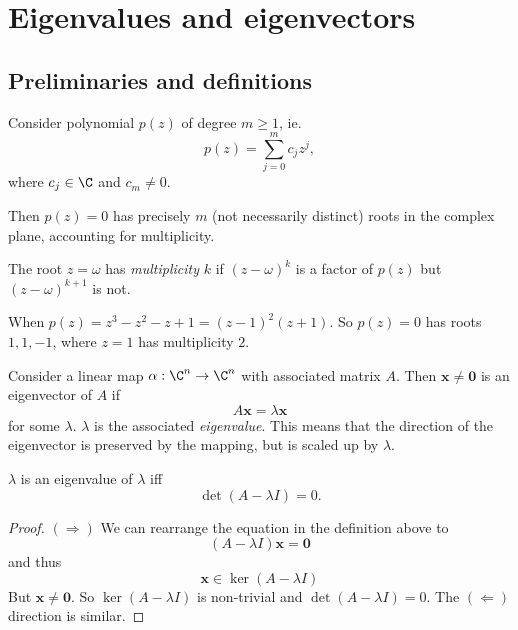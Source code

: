 \documentclass[a4paper]{article}
\begin{document}
\section{Eigenvalues and eigenvectors}
\subsection{Preliminaries and definitions}
\begin{thm}
  Consider polynomial $p(z)$ of degree $m \geq 1$, ie.
  \[
    p(z) = \sum_{j = 0}^m c_jz^j,
  \]
  where $c_j\in \C$ and $c_m \not= 0$.

  Then $p(z) = 0$ has precisely $m$ (not necessarily distinct) roots in the complex plane, accounting for multiplicity.
\end{thm}

\begin{defi}
  The root $z = \omega$ has \emph{multiplicity} $k$ if $(z - \omega)^k$ is a factor of $p(z)$ but $(z - \omega)^{k + 1}$ is not.
\end{defi}

\begin{eg}
  When $p(z) = z^3 - z^2 - z + 1 = (z - 1)^2(z + 1)$. So $p(z) = 0$ has roots $1, 1, -1$, where $z = 1$ has multiplicity $2$.
\end{eg}

\begin{defi}
  Consider a linear map $\alpha: \C^n\to \C^n$ with associated matrix $A$. Then $\mathbf{x}\not= \mathbf{0}$ is an eigenvector of $A$ if
  \[
    A\mathbf{x} = \lambda\mathbf{x}
  \]
  for some $\lambda$. $\lambda$ is the associated \emph{eigenvalue}. This means that the direction of the eigenvector is preserved by the mapping, but is scaled up by $\lambda$.
\end{defi}

\begin{thm}
  $\lambda$ is an eigenvalue of $\lambda$ iff
  \[
    \det(A - \lambda I) = 0.
  \]
\end{thm}

\begin{proof}
  $(\Rightarrow)$ We can rearrange the equation in the definition above to
  \[
    (A - \lambda I)\mathbf{x} = \mathbf{0}
  \]
  and thus
  \[
    \mathbf{x}\in \ker(A - \lambda I)
  \]
  But $\mathbf{x}\not= \mathbf{0}$. So $\ker(A - \lambda I)$ is non-trivial and $\det(A - \lambda I) = 0$. The $(\Leftarrow)$ direction is similar. 
\end{proof}
\end{document}

